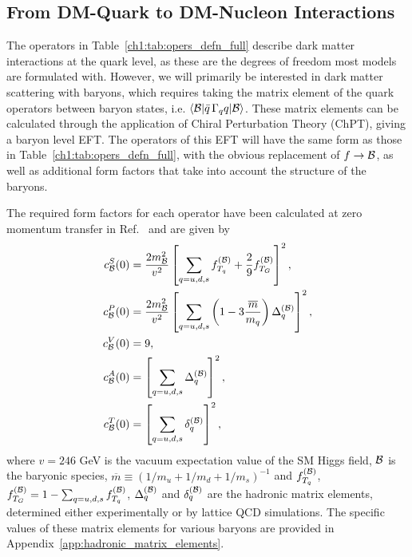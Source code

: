 \subsection{From DM-Quark to DM-Nucleon Interactions}
\label{ch1:subsec:quark_to_nucleon_EFT}

The operators in Table~\ref{ch1:tab:opers_defn_full} describe dark matter interactions at the quark level, as these are the degrees of freedom most models are formulated with. However, we will primarily be interested in dark matter scattering with baryons, which requires taking the matrix element of the quark operators between baryon states, i.e. $\langle {\cal B} | \bar q \, \Gamma_q q| {\cal B}\rangle$. These matrix elements can be calculated through the application of Chiral Perturbation Theory (ChPT), giving a baryon level EFT. The operators of this EFT will have the same form as those in Table~\ref{ch1:tab:opers_defn_full}, with the obvious replacement of $f\rightarrow \cal B$, as well as additional form factors that take into account the structure of the baryons.

The required form factors for each operator have been calculated at zero momentum transfer in Ref.~\cite{Cirelli:2013ufw_oct_Toolsmodelindependentbounds} and are given by 
\begin{align}
c_{\cal B}^S(0) &= \frac{2 m_{\cal B}^2}{v^2}\left[\sum_{q=u,d,s}f_{T_q}^{(\cal B)}+\frac{2}{9}f_{T_G}^{(\cal B)}\right]^2,\label{ch1:eq:cBS}\\
c_{\cal B}^P(0) &= \frac{2 m_{\cal B}^2}{v^2}\left[\sum_{q=u,d,s}\left(1-3\frac{\overline{m}}{m_q}\right)\Delta_q^{(\cal B)}\right]^2,\label{ch1:eq:cBP}\\
c_{\cal B}^V(0) &= 9,\label{ch1:eq:cBV}\\
c_{\cal B}^A(0) &=  \left[\sum_{q=u,d,s}\Delta_q^{(\cal B)}\right]^2,\label{ch1:eq:cBA}\\
c_{\cal B}^T(0) &= \left[\sum_{q=u,d,s}\delta_q^{(\cal B)}\right]^2,\label{ch1:eq:cBT}
\end{align}
where  $v=246$ GeV is the vacuum expectation value of the SM Higgs field, $\cal B$ is the baryonic species,  $\overline{m}\equiv(1/m_u+1/m_d+1/m_s)^{-1}$ and $f_{T_q}^{(\cal B)}$, $f_{T_G}^{(\cal B)}=1-\sum_{q=u,d,s} f_{T_q}^{(\cal B)}$, $\Delta_q^{(\cal B)}$ and $\delta_q^{(\cal B)}$ are the hadronic matrix elements, determined either experimentally or by lattice QCD simulations. The specific values of these matrix elements for various baryons are provided in Appendix~\ref{app:hadronic_matrix_elements}.

